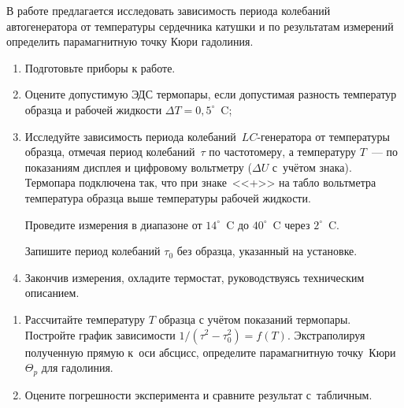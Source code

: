 \begin{lab:task}

	В работе предлагается исследовать зависимость периода колебаний автогенератора от температуры сердечника катушки и по
	результатам измерений определить парамагнитную точку Кюри гадолиния.
	
	\begin{enumerate}
		\item Подготовьте приборы к работе.
		
		\item Оцените допустимую ЭДС термопары, если допустимая разность температур образца и рабочей жидкости $\Delta T=0,5^\circ$~C;
		
		\item Исследуйте зависимость периода колебаний~$LC$-генератора от температуры образца, отмечая период колебаний~$\tau$
		по частотомеру, а температуру $T$~--- по показаниям дисплея и цифровому вольтметру ($\Delta U$ с~учётом знака). Термопара
		подключена так, что при знаке~<<+>> на табло вольтметра температура образца выше температуры рабочей жидкости.
		
		Проведите измерения в диапазоне от $14^\circ$~C до $40^\circ$~C через $2^\circ$~C.
		
		Запишите период колебаний $\tau_0$ без образца, указанный на установке.
		
		\item Закончив измерения, охладите термостат, руководствуясь техническим описанием.
	
	\end{enumerate}
	
	\begin{enumerate}
	
		\item Рассчитайте температуру $T$ образца с учётом показаний термопары. Постройте график зависимости $1/(\tau^2-\tau_0^2)=f(T)$. 
		Экстраполируя полученную прямую к~оси абсцисс, определите парамагнитную точку~Кюри~$\Theta_p$ для гадолиния.
	
		\item Оцените погрешности эксперимента и сравните результат с~табличным.
	
	\end{enumerate}

\end{lab:task}



